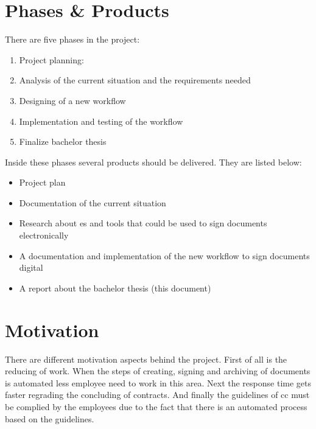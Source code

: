 \section{Phases \& Products} \label{sec:phases}
 There are five phases in the project:
 \begin{enumerate}
 	\item Project planning:
 	\item Analysis of the current situation and the requirements needed
 	\item Designing of a new workflow
 	\item Implementation and testing of the workflow
 	\item Finalize bachelor thesis
 \end{enumerate}
 
 Inside these phases several products should be delivered. They are listed below:
 \begin{itemize}
 	\item Project plan
 	\item Documentation of the current situation
 	\item Research about \gls{es} and tools that could be used to sign documents electronically
 	\item A documentation and implementation of the new workflow to sign documents digital
 	\item A report about the bachelor thesis (this document)
 \end{itemize}
 
 \section{Motivation}
 There are different motivation aspects behind the project. First of all is the reducing of work. When the steps of creating, signing and archiving of documents is automated less employee need to work in this area. Next the response time gets faster regrading the concluding of contracts. And finally the guidelines of \gls{cc} must be complied by the employees due to the fact that there is an automated process based on the guidelines. 